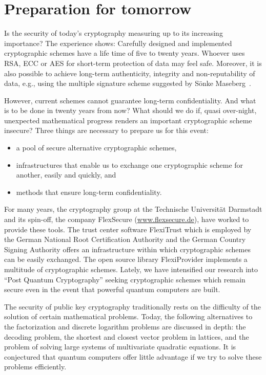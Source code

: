 \section{Preparation for tomorrow}
\label{sec:preparations}

Is the security of today's cryptography measuring
up to its increasing importance?  The experience
shows: Carefully designed and implemented
cryptographic schemes have a life time of five to
twenty years.  Whoever uses RSA, ECC or AES for
short-term protection of data may feel safe.
Moreover, it is also possible to achieve long-term
authenticity, integrity and non-reputability of
data, e.g., using the multiple signature scheme
suggested by S\"onke Maseberg~\cite{maseberg-thesis:2002}.

However, current schemes cannot guarantee
long-term confidentiality.  And what is to be done in
twenty years from now?  What should we do if, quasi
over-night, unexpected mathematical progress
renders an important cryptographic scheme
insecure?  Three things are necessary to prepare
us for this event:

\begin{itemize}
\item a pool of secure alternative cryptographic schemes,
\item infrastructures that enable us to exchange
   one cryptographic scheme for another, easily
   and quickly, and
\item methods that ensure long-term confidentiality.
\end{itemize}

For many years, the cryptography group at the
Technische Universit\"at Darmstadt and its spin-off,
the company FlexSecure (\url{www.flexsecure.de}),
have worked to provide these tools.  The
trust center software FlexiTrust which is employed
by the German National Root Certification
Authority and the German Country Signing Authority
offers an infrastructure within which
cryptographic schemes can be easily exchanged.
The open source library FlexiProvider implements a
multitude of cryptographic schemes.  Lately, we
have intensified our research into ``Post Quantum
Cryptography'' seeking
cryptographic schemes which
remain secure even in the event that powerful
quantum computers are built.

The security of public key cryptography
traditionally rests on the difficulty of the
solution of certain mathematical problems.  Today,
the following alternatives to the factorization and discrete
logarithm problems are discussed in depth:  the
decoding problem, the shortest and closest vector
problem in lattices, and the problem of solving
large systems of multivariate quadratic
equations.  It is conjectured that quantum
computers offer little advantage if we try to
solve these problems efficiently.


